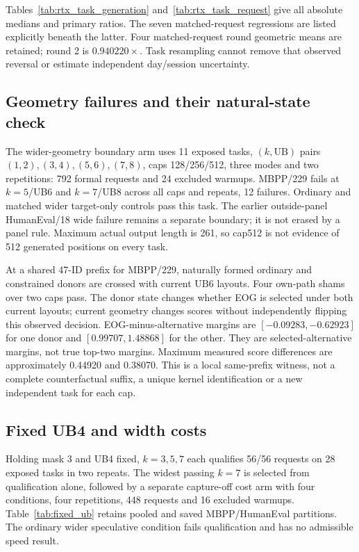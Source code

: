 Tables~\ref{tab:rtx_task_generation} and~\ref{tab:rtx_task_request} give all absolute medians and primary ratios. The seven matched-request regressions are listed explicitly beneath the latter. Four matched-request round geometric means are retained; round 2 is $0.940220\times$. Task resampling cannot remove that observed reversal or estimate independent day/session uncertainty.




\subsection{Geometry failures and their natural-state check}
The wider-geometry boundary arm uses 11 exposed tasks, $(k,\mathrm{UB})$ pairs $(1,2),(3,4),(5,6),(7,8)$, caps 128/256/512, three modes and two repetitions: 792 formal requests and 24 excluded warmups. MBPP/229 fails at $k=5$/UB6 and $k=7$/UB8 across all caps and repeats, 12 failures. Ordinary and matched wider target-only controls pass this task. The earlier outside-panel HumanEval/18 wide failure remains a separate boundary; it is not erased by a panel rule. Maximum actual output length is 261, so cap512 is not evidence of 512 generated positions on every task.

At a shared 47-ID prefix for MBPP/229, naturally formed ordinary and constrained donors are crossed with current UB6 layouts. Four own-path shams over two caps pass. The donor state changes whether EOG is selected under both current layouts; current geometry changes scores without independently flipping this observed decision. EOG-minus-alternative margins are $[-0.09283,-0.62923]$ for one donor and $[0.99707,1.48868]$ for the other. They are selected-alternative margins, not true top-two margins. Maximum measured score differences are approximately 0.44920 and 0.38070. This is a local same-prefix witness, not a complete counterfactual suffix, a unique kernel identification or a new independent task for each cap.

\subsection{Fixed UB4 and width costs}
Holding mask 3 and UB4 fixed, $k=3,5,7$ each qualifies 56/56 requests on 28 exposed tasks in two repeats. The widest passing $k=7$ is selected from qualification alone, followed by a separate capture-off cost arm with four conditions, four repetitions, 448 requests and 16 excluded warmups. Table~\ref{tab:fixed_ub} retains pooled and saved MBPP/HumanEval partitions. The ordinary wider speculative condition fails qualification and has no admissible speed result.

